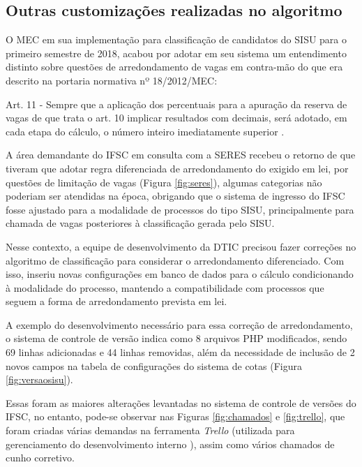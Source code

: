 \subsection{Outras customizações realizadas no algoritmo}
\label{outrasVersoes}

O \gls{MEC} em sua implementação para classificação de candidatos do \gls{SISU} para o primeiro semestre de 2018, acabou por adotar em seu sistema um entendimento distinto sobre questões de arredondamento de vagas em contra-mão do que era descrito na portaria normativa nº 18/2012/MEC:

\begin{citacao}
Art. 11 - Sempre que a aplicação dos percentuais para a apuração da reserva de vagas de que trata o art. 10 implicar resultados com decimais, será adotado, em cada etapa do cálculo, o número inteiro imediatamente superior \cite{portarianr9}.
\end{citacao}



\newpage
A área demandante do \gls{IFSC} em consulta com a \gls{SERES} recebeu o retorno de que tiveram que adotar regra diferenciada de arredondamento do exigido em lei, por questões de limitação de vagas (Figura \ref{fig:seres}), algumas categorias não poderiam ser atendidas na época, obrigando que o sistema de ingresso do \gls{IFSC} fosse ajustado para a modalidade de processos do tipo \gls{SISU}, principalmente para chamada de vagas posteriores à classificação gerada pelo \gls{SISU}.

Nesse contexto, a equipe de desenvolvimento da \gls{DTIC} precisou fazer correções no algoritmo de classificação para considerar o arredondamento diferenciado. Com isso, inseriu novas configurações em banco de dados para o cálculo condicionando à modalidade do processo, mantendo a compatibilidade com processos que seguem a forma de arredondamento prevista em lei.

A exemplo do desenvolvimento necessário para essa correção de arredondamento, o sistema de controle de versão indica como 8 arquivos PHP modificados, sendo 69 linhas adicionadas e 44 linhas removidas, além da necessidade de inclusão de 2 novos campos na tabela de configurações do sistema de cotas (Figura \ref{fig:versaosisu}).



\newpage
Essas foram as maiores alterações levantadas no sistema de controle de versões do \gls{IFSC}, no entanto, pode-se observar nas Figuras \ref{fig:chamados} e \ref{fig:trello}, que foram criadas várias demandas na ferramenta \textit{Trello} (utilizada para gerenciamento do desenvolvimento interno ), assim como vários chamados de cunho corretivo.  

